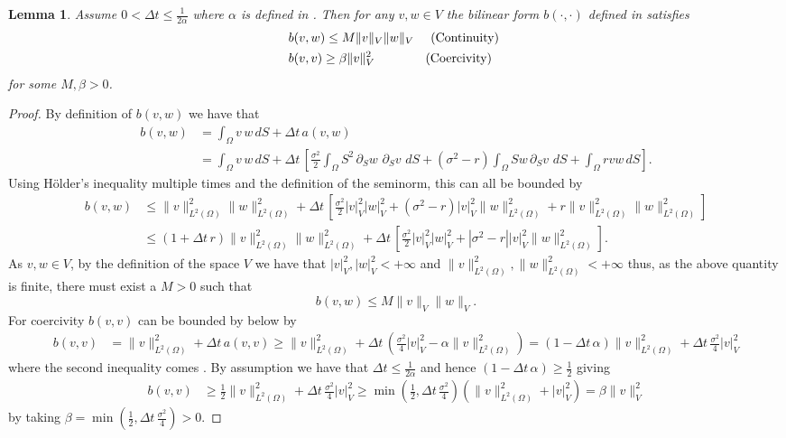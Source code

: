 \documentclass{article}
\newtheorem{lemma}[thm]{Lemma}
\newcommand{\intS}[1]{\ensuremath{\int_{\Omega}#1 \, dS}}
\newcommand{\darg}[2]{\ensuremath{\, \partial_{#2}#1} \, }
\newcommand{\dS}[1]{\ensuremath{\darg{#1}{S}}}
\newcommand{\sigmafrac}{\ensuremath{\frac{\sigma^2}{2}}}
\newcommand{\seminormsq}[1]{\ensuremath{|#1|_V^2}}
\newcommand{\normsq}[1]{\ensuremath{\|#1\|_{L^2(\Omega)}^2}}
\newcommand{\aform}[2]{\ensuremath{\sigmafrac \intS{S^2 \dS{#2} \dS{#1}} + (\sigma^2 - r) \intS{S #2 \dS{#1}} + \intS{r  #1  #2}}}
\begin{document}
\begin{lemma}\label{lemma:b_lax_assump}
    Assume $0<\Delta t \leq \frac{1}{2\alpha}$ where $\alpha$ is defined in . Then for any $v,w \in V$ the bilinear form $b(\cdot, \cdot)$ defined in  satisfies
    \begin{align*}
        & b(v,w) \leq M \| v\|_V \| w\|_V \quad \text{ (Continuity) }\\
        &b(v,v) \geq \beta \| v\|_V^2 \qquad \hspace{6mm} \text{ (Coercivity) }
    \end{align*}
    for some $M,\beta>0$.
\end{lemma}
\begin{proof}
    By definition of $b(v, w)$ we have that
    \begin{align*}
        b(v,w) &= \intS{v\,w} + \Delta t\,a(v,w)\\
        &= \intS{v\,w} + \Delta t\, \left[\aform{v}{w}\right].
    \end{align*}
    Using Hölder's inequality multiple times and the definition of the seminorm, this can all be bounded by
    \begin{align*}
        b(v,w)  &\leq \normsq{v}\normsq{w} + \Delta t\, \left[ \sigmafrac\seminormsq{v}\seminormsq{w} + (\sigma^2 - r ) \seminormsq{v}\normsq{w} + r \normsq{v} \normsq{w}\right]\\
        &\leq (1+ \Delta t \,r)\normsq{v} \normsq{w} + \Delta t\, \left[\sigmafrac\seminormsq{v}\seminormsq{w} + \left|\sigma^2 - r\right| \seminormsq{v}\normsq{w}\right].
    \end{align*}
    As $v,w \in V$, by the definition of the space $V$ we have that $\seminormsq{v}, \seminormsq{w} < + \infty$ and $\normsq{v}, \normsq{w} < + \infty$ thus, as the above quantity is finite, there must exist a $M >0$ such that
    \begin{equation*}
        b(v,w)  \leq M \| v\|_V \| w\|_V.
    \end{equation*}
    For coercivity $b(v, v)$ can be bounded by below by
    \begin{align*}
        b(v, v) &= \normsq{v} + \Delta t\, a(v,v) \geq \normsq{v} + \Delta t\, \left( \frac{\sigma^2}{4} \seminormsq{v} - \alpha \normsq{v} \right) = \left(1 - \Delta t \, \alpha  \right) \normsq{v} +\Delta t\, \frac{\sigma^2}{4} \seminormsq{v}
    \end{align*}
    where the second inequality comes . By assumption we have that $\Delta t \leq \frac{1}{2\alpha}$ and hence $\left(1 - \Delta t \, \alpha  \right) \geq \frac{1}{2}$ giving
    \begin{align*}
        b(v, v) &\geq \frac{1}{2}\normsq{v} +\Delta t\, \frac{\sigma^2}{4} \seminormsq{v} \geq \min\left(\frac{1}{2}, \Delta t\,\frac{\sigma^2}{4}\right) \left( \normsq{v} +  \seminormsq{v}\right)= \beta \| v\|_V^2
    \end{align*}
    by taking $\beta = \min\left(\frac{1}{2}, \Delta t\,\frac{\sigma^2}{4}\right) > 0$. \qedhere
\end{proof}
\end{document}
